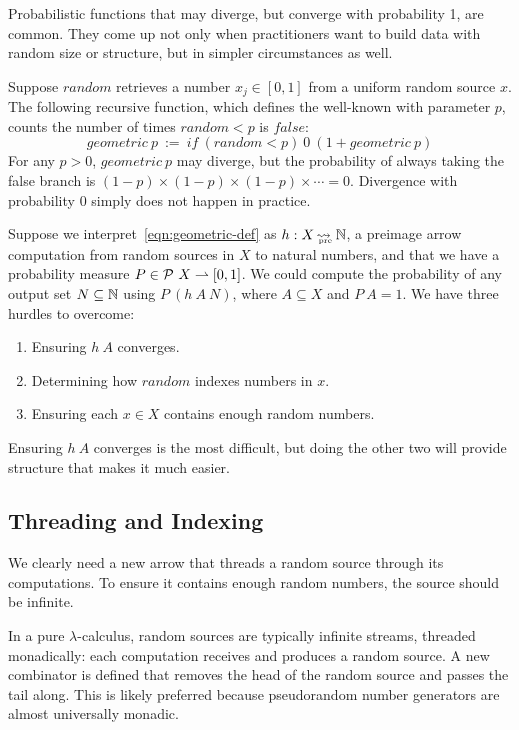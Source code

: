 \documentclass[preprint]{sigplanconf}
\newcommand{\arrow}{\rightsquigarrow}
\newcommand{\pto}{\rightharpoonup}
\newcommand{\pre}{_\mathrm{pre}}
\DeclareMathOperator{\preto}{\arrow_{\mspace{-19mu}\pre}}
\begin{document}
Probabilistic functions that may diverge, but converge with probability 1, are common.
They come up not only when practitioners want to build data with random size or structure, but in simpler circumstances as well.

Suppose $random$ retrieves a number $x_j \in [0,1]$ from a uniform random source $x$.
The following recursive function, which defines the well-known  with parameter $p$, counts the number of times $random < p$ is $false$:
\begin{equation}
	geometric~p \ := \ if~(random < p)~0~(1 + geometric~p)
\label{eqn:geometric-def}
\end{equation}
For any $p > 0$, $geometric~p$ may diverge, but the probability of always taking the false branch is $(1-p) \times (1-p) \times (1-p) \times \cdots = 0$.
Divergence with probability $0$ simply does not happen in practice.

Suppose we interpret~\eqref{eqn:geometric-def} as $h : X \preto \Nat$, a preimage arrow computation from random sources in $X$ to natural numbers, and that we have a probability measure $P \in \powerset~X \pto [0,1]$.
We could compute the probability of any output set $N \subseteq \mathbb{N}$ using $P~(h~A~N)$, where $A \subseteq X$ and $P~A = 1$. We have three hurdles to overcome:
\begin{enumerate}
	\item Ensuring $h~A$ converges.
	\item Determining how $random$ indexes numbers in $x$.
	\item Ensuring each $x \in X$ contains enough random numbers.
\end{enumerate}
Ensuring $h~A$ converges is the most difficult, but doing the other two will provide structure that makes it much easier.

\subsection{Threading and Indexing}

We clearly need a new arrow that threads a random source through its computations.
To ensure it contains enough random numbers, the source should be infinite.

In a pure $\lambda$-calculus, random sources are typically infinite streams, threaded monadically: each computation receives and produces a random source.
A new combinator is defined that removes the head of the random source and passes the tail along.
This is likely preferred because pseudorandom number generators are almost universally monadic.
\end{document}
